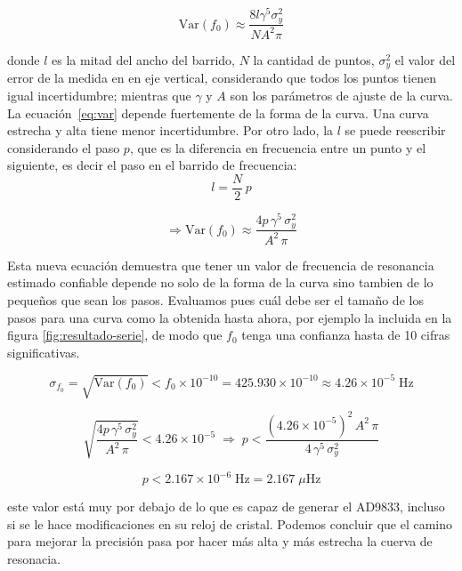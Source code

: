 \begin{equation} \label{eq:var}
    \mathrm{Var}(f_0) \approx \frac{8l\gamma^5\sigma_y^2}{NA^2\pi} 
\end{equation}

donde $l$ es la mitad del ancho del barrido, $N$ la cantidad de puntos, $\sigma_y^2$ el valor del error de la medida en en eje vertical, considerando que todos los puntos tienen igual incertidumbre; mientras que $\gamma$ y $A$ son los parámetros de ajuste de la curva. La ecuación~\ref{eq:var} depende fuertemente de la forma de la curva. Una curva estrecha y alta tiene menor incertidumbre. Por otro lado, la $l$ se puede reescribir considerando el paso $p$, que es la diferencia en frecuencia entre un punto y el siguiente, es decir el paso en el barrido de frecuencia:
\begin{equation}
    l = \frac{N}{2}\,p 
\end{equation}

\begin{equation} \label{eq:error_f0}
    \Rightarrow \mathrm{Var}(f_0) \approx \frac{4p\,\gamma^5\,\sigma_y^2}{A^2\,\pi}
\end{equation}

Esta nueva ecuación demuestra que tener un valor de frecuencia de resonancia estimado confiable depende no solo de la forma de la curva sino tambien de lo pequeños que sean los pasos. Evaluamos pues cuál debe ser el tamaño de los pasos para una curva como la obtenida hasta ahora, por ejemplo la incluida en la figura \ref{fig:resultado-serie}, de modo que $f_0$ tenga una confianza hasta de 10 cifras significativas.

\begin{equation}
    \sigma_{f_0} = \sqrt{\mathrm{Var}(f_0)} < f_0 \times 10^{-10} = 425.930\times 10^{-10} \approx 4.26\times 10^{-5}\;\text{Hz}
\end{equation}

\begin{equation}
    \sqrt{\frac{4p\,\gamma^5\,\sigma_y^2}{A^2\,\pi}} < 4.26\times 10^{-5}
    \;\Rightarrow\;
    p < \frac{(4.26\times 10^{-5})^2\,A^2\,\pi}{4\,\gamma^5\,\sigma_y^2} \tag{19}
\end{equation}

\begin{equation}
    p < 2.167\times 10^{-6}\;\text{Hz} = 2.167\;\mu\text{Hz}
\end{equation}

este valor está muy por debajo de lo que es capaz de generar el AD9833, incluso si se le hace modificaciones en su reloj de cristal. Podemos concluir que el camino para mejorar la precisión pasa por hacer más alta y más estrecha la cuerva de resonacia.


